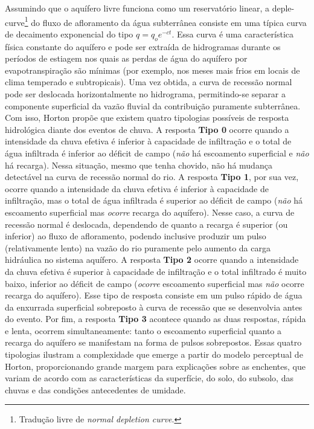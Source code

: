\documentclass[./main.tex]{subfiles}
\begin{document}
\noindent Assumindo que o aquífero livre funciona como um reservatório linear, a \gls{deple-curve}\footnote{Tradução livre de \textit{normal depletion curve}.} do fluxo de afloramento da água subterrânea consiste em uma típica curva de decaimento exponencial do tipo $q = q_o e^{-c t}$. Essa curva é uma característica física constante do aquífero e pode ser extraída de hidrogramas durante os períodos de estiagem nos quais as perdas de água do aquífero por evapotranspiração são mínimas (por exemplo, nos meses mais frios em locais de clima temperado e subtropicais). Uma vez obtida, a curva de recessão normal pode ser deslocada horizontalmente no hidrograma, permitindo-se separar a componente superficial da vazão fluvial da contribuição puramente subterrânea. Com isso, Horton propõe que existem quatro  tipologias possíveis de resposta hidrológica diante dos eventos de chuva. A resposta \textbf{Tipo 0} ocorre quando a intensidade da chuva efetiva é inferior à capacidade de infiltração e o total de água infiltrada é inferior ao déficit de campo (\textit{não} há escoamento superficial e \textit{não} há recarga). Nessa situação, mesmo que tenha chovido, não há mudança detectável na curva de recessão normal do rio. A resposta \textbf{Tipo 1}, por sua vez, ocorre quando a intensidade da chuva efetiva é inferior à capacidade de infiltração, mas o total de água infiltrada é superior ao déficit de campo (\textit{não} há escoamento superficial mas \textit{ocorre} recarga do aquífero). Nesse caso, a curva de recessão normal é deslocada, dependendo de quanto a recarga é superior (ou inferior) ao fluxo de afloramento, podendo inclusive produzir um pulso (relativamente lento) na vazão do rio puramente pelo aumento da carga hidráulica no sistema aquífero. A resposta \textbf{Tipo 2} ocorre quando a intensidade da chuva efetiva é superior à capacidade de infiltração e o total infiltrado é muito baixo, inferior ao déficit de campo (\textit{ocorre} escoamento superficial mas \textit{não} ocorre recarga do aquífero). Esse tipo de resposta consiste em um pulso rápido de água da enxurrada superficial sobreposto à curva de recessão que se desenvolvia antes do evento. Por fim, a resposta \textbf{Tipo 3} acontece quando as duas respostas, rápida e lenta, ocorrem simultaneamente: tanto o escoamento superficial quanto a recarga do aquífero se manifestam na forma de pulsos sobrepostos. Essas quatro tipologias ilustram a complexidade que emerge a partir do modelo perceptual de Horton, proporcionando grande margem para explicações sobre as enchentes, que variam de acordo com as características da superfície, do solo, do subsolo, das chuvas e das condições antecedentes de umidade.
\end{document}
